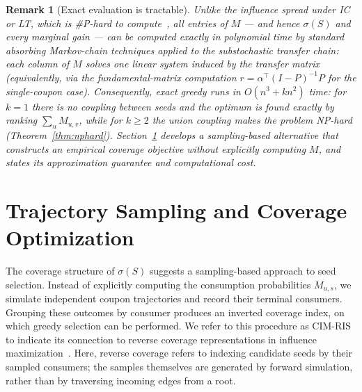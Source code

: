 \documentclass[sigconf]{acmart}
\newcommand{\CIMRIS}{\textsc{CIM-RIS}}
\newtheorem{remark}{Remark}[section]
\begin{document}
\begin{remark}[Exact evaluation is tractable]
\label{rem:tractable-eval}
Unlike the influence spread under IC or LT, which is
\#P-hard to compute~\cite{chen2010scalable}, all entries of $M$ ---
and hence $\sigma(S)$ and every marginal gain --- can be computed
\emph{exactly} in polynomial time by standard absorbing Markov-chain
techniques applied to the substochastic transfer chain: each column
of $M$ solves one linear system induced by the transfer matrix
(equivalently, via the fundamental-matrix computation
$r=\alpha^{\top}(I-P)^{-1}P$ for the single-coupon case).
Consequently, exact greedy runs in $O(n^3+kn^2)$ time: for $k=1$
there is no coupling between seeds and the optimum is found exactly
by ranking $\sum_{u}M_{u,v}$, while for $k\ge 2$ the union coupling
makes the problem NP-hard (Theorem~\ref{thm:nphard}).
Section~\ref{sec:algo} develops a sampling-based alternative that
constructs an empirical coverage objective without explicitly computing
$M$, and states its approximation guarantee and computational cost.
\end{remark}












\section{Trajectory Sampling and Coverage Optimization}
\label{sec:algo}

The coverage structure of $\sigma(S)$ suggests a sampling-based approach
to seed selection. Instead of explicitly computing the consumption
probabilities $M_{u,s}$, we simulate independent coupon trajectories and
record their terminal consumers. Grouping these outcomes by consumer
produces an inverted coverage index, on which greedy selection can be
performed. We refer to this procedure as \CIMRIS{} to indicate its
connection to reverse coverage representations in influence
maximization~\cite{borgs2014maximizing,tang2015influence}.
Here, reverse coverage refers to indexing candidate seeds by their
sampled consumers; the samples themselves are generated by forward
simulation, rather than by traversing incoming edges from a root.
\end{document}

